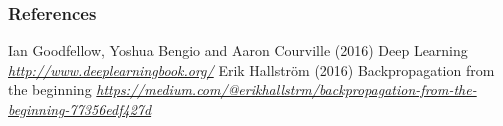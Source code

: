 

\begin{vbframe}
\frametitle{References}
\footnotesize{
\begin{thebibliography}{99}

 Ian Goodfellow, Yoshua Bengio and Aaron Courville (2016)
\newblock Deep Learning
\newblock \emph{\url{http://www.deeplearningbook.org/}}
 Erik Hallstr\"{o}m (2016)
\newblock Backpropagation from the beginning
\newblock \emph{\url{https://medium.com/@erikhallstrm/backpropagation-from-the-beginning-77356edf427d}}

\end{thebibliography}
}
\end{vbframe}


\endlecture

